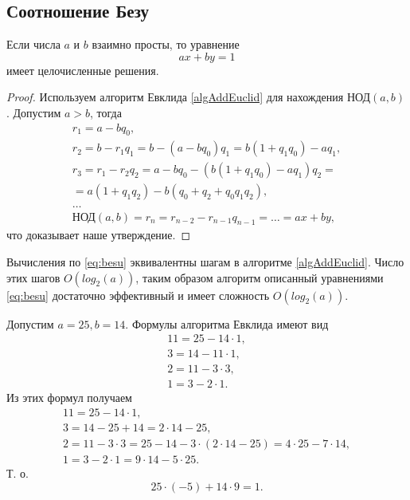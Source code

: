 \subsection{Соотношение Безу}

\begin{theorem}[Безу]
\label{thm:besu}
Если числа $a$ и $b$ взаимно просты, то уравнение 
\[
ax + by = 1
\] 
имеет целочисленные решения.
\begin{proof}
Используем алгоритм Евклида \ref{algAddEuclid} для нахождения
$\mbox{НОД}\left(a, b\right)$.
Допустим $a > b$, тогда
\begin{eqnarray}
r_1 = a - b q_0, 
\nonumber \\
r_2 = b - r_1 q_1 = b - (a - b q_0)q_1 = b(1+q_1 q_0) - a q_1, 
\nonumber \\
r_3 = r_1 - r_2 q_2 = a - b q_0 - \left(b(1+q_1 q_0) - a q_1\right)q_2
= \nonumber \\
= a(1+q_1 q_2) - b(q_0 + q_2 + q_0 q_1 q_2),
\nonumber \\
\dots
\nonumber \\
\mbox{НОД}\left(a, b\right) = r_n = r_{n-2} - r_{n-1} q_{n-1} = \dots
= a x + b y, 
\label{eq:besu}
\end{eqnarray}
что доказывает наше утверждение.
\end{proof}
\end{theorem}

\begin{remark}
\label{rem:besu}
Вычисления по \eqref{eq:besu} эквивалентны шагам в алгоритме
\ref{algAddEuclid}. Число этих шагов $O\left(log_2(a)\right)$, таким образом
алгоритм описанный уравнениями \eqref{eq:besu} достаточно эффективный
и  имеет сложность $O\left(log_2(a)\right)$.
\end{remark}

\begin{example}
\label{ex:besu}
Допустим $a = 25, b = 14$. Формулы алгоритма Евклида имеют вид
\begin{eqnarray}
11 = 25 - 14 \cdot 1,
\nonumber \\
3 = 14 - 11 \cdot 1,
\nonumber \\
2 = 11 - 3 \cdot 3,
\nonumber \\
1 = 3 - 2 \cdot 1.
\nonumber
\end{eqnarray}
Из этих формул получаем
\begin{eqnarray}
11 = 25 - 14 \cdot 1,
\nonumber \\
3 = 14 - 25 + 14 = 2 \cdot 14 - 25,
\nonumber \\
2 = 11 - 3 \cdot 3 = 25 - 14 - 3 \cdot (2 \cdot 14 - 25) = 4 \cdot 25 - 7 \cdot
14,
\nonumber \\
1 = 3 - 2 \cdot 1 = 9 \cdot 14 - 5 \cdot 25.
\nonumber
\end{eqnarray}
Т. о. 
\[
25 \cdot (-5)  + 14 \cdot 9 = 1.
\]
\end{example}
